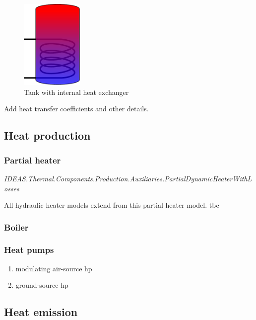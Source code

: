 \begin{figure}%
\begin{left}
\includegraphics[width=3cm]{Thermal/images/HydraulicScheme.pdf}%
\caption{Tank with internal heat exchanger}%
\label{tankinternal}%
\end{left}
\end{figure}

Add heat transfer coefficients and other details.

\subsection{Heat production}

\subsubsection{Partial heater}

\emph{IDEAS.Thermal.Components.Production.Auxiliaries.PartialDynamicHeaterWithLosses}

\vspace{6mm}

All hydraulic heater models extend from this partial heater model.  
tbc

\subsubsection{Boiler}

\subsubsection{Heat pumps}

\begin{enumerate}
	\item modulating air-source hp
	\item ground-source hp
\end{enumerate}

\subsection{Heat emission}


